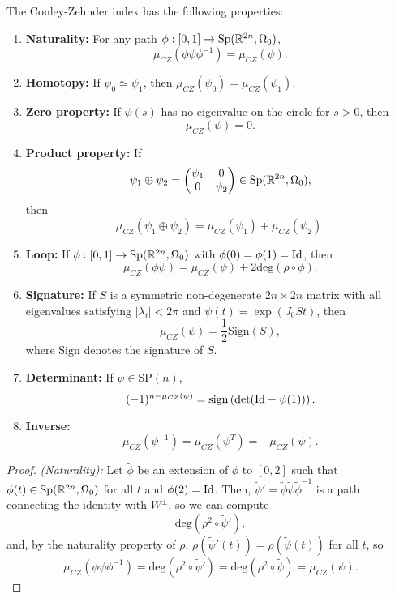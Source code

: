 \begin{prop} \label{conleyzehnderproperties} The Conley-Zehnder index has the following properties:
\begin{enumerate}
	\item {\bf Naturality:} For any path $\phi : [0,1] \rightarrow \mathrm{Sp}(\mathbb{R}^{2n},\Omega_0)$,
	\[\mu_{CZ}(\phi \psi \phi^{-1}) = \mu_{CZ}(\psi) .\]
	\item {\bf Homotopy:} If $\psi_0 \simeq \psi_1$, then $\mu_{CZ}(\psi_0) = \mu_{CZ}(\psi_1)$.
	\item {\bf Zero property:} If $\psi(s)$ has no eigenvalue on the circle for $s > 0$, then
	\[\mu_{CZ}(\psi) = 0 .\]
	\item {\bf Product property:} If
	\[\psi_1 \oplus \psi_2 = \begin{pmatrix} \psi_1 & 0 \\ 0 & \psi_2 \end{pmatrix} \in \mathrm{Sp}(\mathbb{R}^{2n},\Omega_0),\]
	then
	\[\mu_{CZ}(\psi_1 \oplus \psi_2) = \mu_{CZ}(\psi_1) + \mu_{CZ}(\psi_2) .\]
	\item {\bf Loop:} If $\phi : [0,1] \rightarrow \mathrm{Sp}(\mathbb{R}^{2n},\Omega_0)$ with $\phi(0) = \phi(1) = \mathrm{Id}$, then
	\[\mu_{CZ}(\phi \psi) = \mu_{CZ}(\psi) + 2 \text{deg}(\rho \circ \phi) .\]
	\item {\bf Signature:} If $S$ is a symmetric non-degenerate $2n \times 2n$ matrix with all eigenvalues satisfying $|\lambda_i| < 2\pi$ and $\psi(t) = \exp(J_0St)$, then
	\[\mu_{CZ}(\psi) = \frac12 \mathrm{Sign}(S),\]
	where $\mathrm{Sign}$ denotes the signature of $S$.
	\item {\bf Determinant:} If $\psi \in \text{SP}(n)$,
	\[(-1)^{n-\mu_{CZ}(\psi)} = \mathrm{sign} \left( \det(\mathrm{Id} - \psi(1)) \right) .\]
	\item {\bf Inverse:}
	\[\mu_{CZ}(\psi^{-1}) = \mu_{CZ}(\psi^T) = - \mu_{CZ}(\psi) .\]
\end{enumerate}
\end{prop}

\begin{proof} {\it (Naturality):} Let $\widetilde{\phi}$ be an extension of $\phi$ to $[0,2]$ such that $\phi(t) \in \mathrm{Sp}(\mathbb{R}^{2n},\Omega_0)$ for all $t$ and $\phi(2) = \mathrm{Id}$. Then, $\widetilde{\psi}' = \widetilde{\phi} \widetilde{\psi} \widetilde{\phi}^{-1}$ is a path connecting the identity with $W^{\pm}$, so we can compute
\[\text{deg}(\rho^2 \circ \widetilde{\psi}'),\]
and, by the naturality property of $\rho$, $\rho(\widetilde{\psi}'(t)) = \rho(\widetilde{\psi}(t))$ for all $t$, so
\[\mu_{CZ}(\phi\psi\phi^{-1}) = \text{deg}(\rho^2 \circ \widetilde{\psi}') = \text{deg}(\rho^2 \circ \widetilde{\psi}) = \mu_{CZ}(\psi) .\]
\end{proof}

